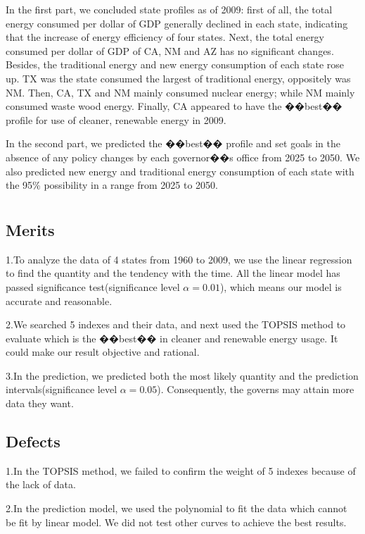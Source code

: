 \documentclass[12pt]{article}
\begin{document}
In the first part, we concluded state profiles as of 2009: first of all, the total energy consumed per dollar of GDP generally declined in each state, indicating that the increase of energy efficiency of four states. Next, the total energy consumed per dollar of GDP of CA, NM and AZ has no significant changes.
Besides, the traditional energy and new energy consumption of each state rose up. TX was the state consumed the largest of traditional energy, oppositely was NM. Then, CA, TX and NM mainly consumed nuclear energy; while NM mainly consumed waste wood energy. Finally, CA appeared to have the ��best�� profile for use of cleaner, renewable energy in 2009.

In the second part, we predicted the ��best�� profile and set goals in the absence of any policy changes by each governor��s office from 2025 to 2050. We also predicted new energy and traditional energy consumption of each state with the 95\% possibility in a range from 2025 to 2050.


\section{}
\subsection{Merits}

  1.To analyze the data of 4 states from 1960 to 2009, we use the linear regression to find the quantity and the tendency with the time. All the linear model has passed significance test(significance level $\alpha=0.01$), which means our model is accurate and reasonable.

  2.We searched 5 indexes and their data, and next used the TOPSIS method to evaluate which is the ��best�� in cleaner and renewable energy usage. It could make our result objective and rational.

 3.In the prediction, we predicted both the most likely quantity and the prediction intervals(significance level $\alpha=0.05$). Consequently, the governs may attain more data they want.

\subsection{Defects}
 1.In the TOPSIS method, we failed to confirm the weight of 5 indexes because of the lack of data.


  2.In the prediction model, we used the polynomial to fit the data which cannot be fit by linear model. We did not test other curves to achieve the best results.
\end{document}
